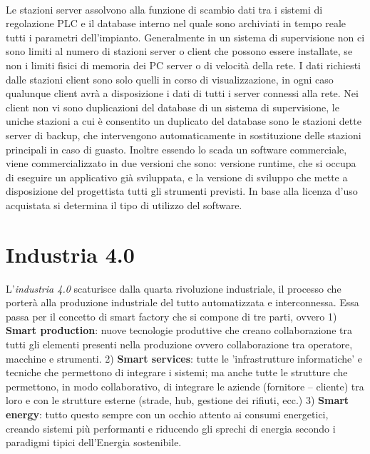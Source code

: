 \documentclass[12pt, a4paper, oneside]{book}
\begin{document}
\\Le stazioni server assolvono alla funzione di scambio dati tra i sistemi di regolazione PLC e il database interno nel quale sono archiviati in tempo reale tutti i parametri dell'impianto. Generalmente in un sistema di supervisione non ci sono limiti al numero di stazioni server o client che possono essere installate, se non i limiti fisici di memoria dei PC server o di velocità della rete. I dati richiesti dalle stazioni client sono solo quelli in corso di visualizzazione, in ogni caso qualunque client avrà a disposizione i dati di tutti i server connessi alla rete. Nei client non vi sono duplicazioni del database di un sistema di supervisione, le uniche stazioni a cui è consentito un duplicato del database sono le stazioni dette server di backup, che intervengono automaticamente in sostituzione delle stazioni principali in caso di guasto. Inoltre essendo lo scada un software commerciale, viene commercializzato in due versioni che sono: versione runtime, che si occupa di eseguire un applicativo già sviluppata, e la versione di sviluppo che mette a disposizione del progettista tutti gli strumenti previsti. In base alla licenza d'uso acquistata si determina il tipo di utilizzo del software. 


\section{Industria 4.0}
L'\textit{industria 4.0} scaturisce dalla quarta rivoluzione industriale, il processo che porterà alla produzione industriale del tutto automatizzata e interconnessa. Essa passa per il concetto di smart factory che si compone di tre parti, ovvero 1) \textbf{Smart production}: nuove tecnologie produttive che creano collaborazione tra tutti gli elementi presenti nella produzione ovvero collaborazione tra operatore, macchine e strumenti. 2) \textbf{Smart services}: tutte le 'infrastrutture informatiche' e tecniche che permettono di integrare i sistemi; ma anche tutte le strutture che permettono, in modo collaborativo, di integrare le aziende (fornitore – cliente) tra loro e con le strutture esterne (strade, hub, gestione dei rifiuti, ecc.) 3) \textbf{Smart energy}: tutto questo sempre con un occhio attento ai consumi energetici, creando sistemi più performanti e riducendo gli sprechi di energia secondo i paradigmi tipici dell'Energia sostenibile.
\end{document}
